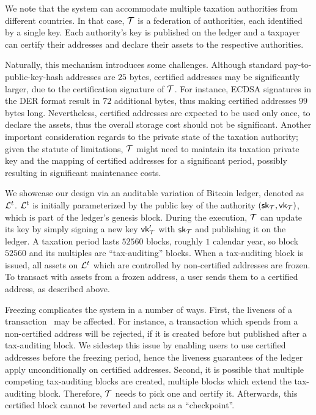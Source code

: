 We note that the system can accommodate multiple taxation authorities from
different countries. In that case, $\mathcal{T}$ is a federation of authorities,
each identified by a single key. Each authority's key is published on the
ledger and a taxpayer can certify their addresses and declare their assets to
the respective authorities.

Naturally, this mechanism introduces some challenges. Although standard
pay-to-public-key-hash addresses are $25$ bytes, certified addresses may be
significantly larger, due to the certification signature of $\mathcal{T}$. For
instance, ECDSA signatures in the DER format result in $72$ additional bytes,
thus making certified addresses $99$ bytes long. Nevertheless, certified
addresses are expected to be used only once, to declare the assets, thus the
overall storage cost should not be significant. Another important consideration
regards to the private state of the taxation authority; given the statute of
limitations, $\mathcal{T}$ might need to maintain its taxation private key and the
mapping of certified addresses for a significant period,
possibly resulting in significant maintenance costs.

We showcase our design via an auditable variation of Bitcoin ledger, denoted as
$\mathcal{L}^{t}$. $\mathcal{L}^{t}$ is initially parameterized by the public key of the
authority $(\mathsf{sk}_{\mathcal{T}}, \mathsf{vk}_{\mathcal{T}})$, which is
part of the ledger's genesis block. During the execution, $\mathcal{T}$ can update
its key by simply signing a new key $\mathsf{vk}_{\mathcal{T}}'$ with
$\mathsf{sk}_{\mathcal{T}}$ and publishing it on the ledger. A taxation period lasts
$52560$ blocks, \ie roughly $1$ calendar year, so block $52560$ and its
multiples are ``tax-auditing'' blocks.  When a tax-auditing block is issued,
all assets on $\mathcal{L}^{t}$ which are controlled by non-certified addresses are
frozen. To transact with assets from a frozen address, a user sends them to a
certified address, as described above.

Freezing complicates the system in a number of ways. First, the liveness
of a transaction~\cite{EC:GarKiaLeo15} may be affected. For
instance, a transaction which spends from a non-certified address will be
rejected, if it is created before but published after a tax-auditing block. We
sidestep this issue by enabling users to use certified addresses before the
freezing period, hence the liveness guarantees of the ledger apply
unconditionally on certified addresses. Second, it is possible that multiple
competing tax-auditing blocks are created, \eg multiple blocks which extend the
tax-auditing block. Therefore, $\mathcal{T}$ needs to pick one and certify it.
Afterwards, this certified block cannot be reverted and acts as a
``checkpoint''.

